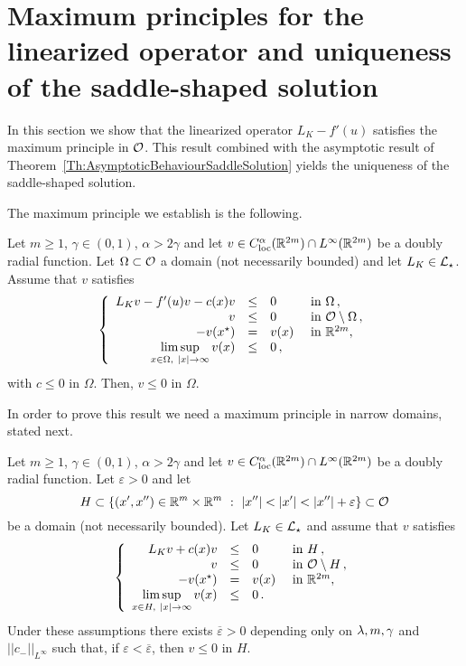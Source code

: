\section{Maximum principles for the linearized operator and uniqueness of the saddle-shaped solution}
\label{Sec:MaximumPrinciple}

In this section we show that the linearized operator $L_K  -f'(u)$ satisfies the maximum principle in $\mathcal{O}$. This result combined with the asymptotic result of Theorem~\ref{Th:AsymptoticBehaviourSaddleSolution} yields the uniqueness of the saddle-shaped solution.

The maximum principle we establish is the following.

\begin{proposition}
	\label{Prop:MaximumPrincipleLinearized}
	Let $m\geq 1$, $\gamma \in (0,1)$, $\alpha > 2\gamma$ and let $v\in C^\alpha_{\mathrm{loc}}(\mathbb{R}^{2m})\cap L^\infty(\mathbb{R}^{2m})$ be a doubly radial function. Let $\Omega \subset \mathcal{O}$ a domain (not necessarily bounded) and let $L_K  \in \mathcal{L}_\star$. Assume that $v$ satisfies
	$$
	\left\{\begin{array}{rcll}
	L_K v - f'(u)v - c(x)v &\leq & 0 &\textrm{ in } \Omega\,,\\
	v &\leq & 0 &\textrm{ in } \mathcal{O} \setminus \Omega\,,\\
	- v(x^\star) & = & v(x) &\textrm{ in } \mathbb{R}^{2m},\\
	\displaystyle \limsup_{x\in \Omega, \ |x|\to \infty} v(x) &\leq & 0\,,
	\end{array} \right.
	$$
	with $c\leq 0$ in $\Omega$.
	Then, $v \leq 0$ in $\Omega$.
\end{proposition}

In order to prove this result we need a maximum principle in narrow domains, stated next.

\begin{proposition}
	\label{Prop:MaximumPrincipleNarrowDomainsOdd}
	Let $m\geq 1$, $\gamma \in (0,1)$, $\alpha > 2\gamma$ and let $v\in C^\alpha_{\mathrm{loc}}(\mathbb{R}^{2m})\cap L^\infty(\mathbb{R}^{2m})$ be a doubly radial function. Let $\varepsilon>0$ and let
	$$
	H \subset \{(x',x'')\in \R^m\times\R^m \ : \ |x''|<|x'|<|x''|+ \varepsilon\} \subset \ocal
	$$ 
	be a domain (not necessarily bounded). Let $L_K  \in \mathcal{L}_\star$ and assume that $v$ satisfies
	\begin{equation}
	\label{Eq:AssumptionsMaxPNarrow}
	\left\{\begin{array}{rcll}
	L_K v + c(x)v&\leq & 0 &\textrm{ in } H\,,\\
	v &\leq & 0 &\textrm{ in } \mathcal{O} \setminus H\,,\\
	- v(x^\star) & = & v(x) &\textrm{ in } \mathbb{R}^{2m},\\
	\displaystyle \limsup_{x\in H, \ |x|\to \infty} v(x) &\leq & 0\,.
	\end{array} \right.
	\end{equation}
	Under these assumptions there exists $\overline{\varepsilon}>0$ depending only on $\lambda, m, \gamma$ and $||c_-||_{L^\infty}$ such that, if $\varepsilon<\overline{\varepsilon}$, then $v \leq 0$ in $H$.
\end{proposition}

